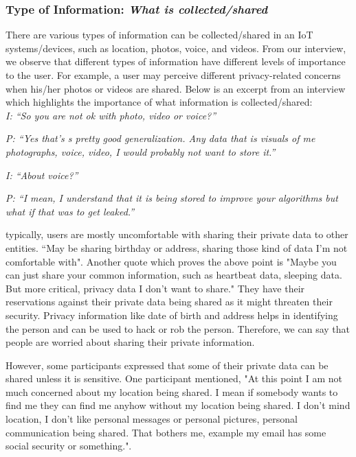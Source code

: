 \subsubsection{Type of Information: \textit{What is collected/shared}}
There are various types of information can be collected/shared in an IoT systems/devices, such as location, photos, voice, and videos. From our interview, we observe that different types of information have different levels of importance to the user. For example, a user may perceive different privacy-related concerns when his/her photos or videos are shared. Below is an excerpt from an interview which highlights the importance of what information is collected/shared:\\

\textit{I: ``So you are not ok with photo, video or voice?''\\}

\textit{P: ``Yes that's s pretty good generalization. Any data that is visuals of me photographs, voice, video, I would probably not want to store it.''\\}

\textit{I: ``About voice?''\\}

\textit{P: ``I mean, I understand that it is being stored to improve your algorithms but what if that was to get leaked.''\\}

typically, users are mostly uncomfortable with sharing their private data to other entities. ``May be sharing birthday or address, sharing those kind of data I'm not comfortable with". Another quote which proves the above point is "Maybe you can just share your common information, such as heartbeat data, sleeping data. But more critical, privacy data I don't want to share." They have their reservations against their private data being shared as it might threaten their security. Privacy information like date of birth and address helps in identifying the person and can be used to hack or rob the person. Therefore, we can say that people are worried about sharing their private information.

However, some participants expressed that some of their private data can be shared unless it is sensitive. One participant mentioned, "At this point I am not much concerned about my location being shared. I mean if somebody wants to find me they can find me anyhow without my location being shared. I don't mind location, I don't like personal messages or personal pictures, personal communication being shared. That bothers me, example my email has some social security or something.".

